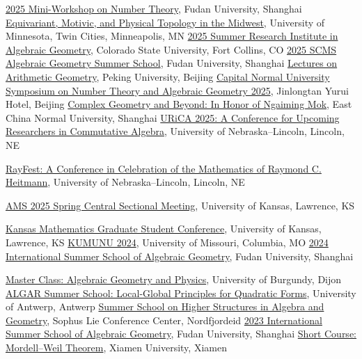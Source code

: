 \documentclass[11pt,letterpaper,sans]{moderncv}
\begin{document}
\cvitem{\textcolor{color1}{2025}}{}
  {\href{https://scms.fudan.edu.cn/info/5743/11611.htm}{2025 Mini-Workshop on Number Theory}, Fudan University, Shanghai}
  {\href{https://cse.umn.edu/math/events/equivariant-motivic-and-physical-topology-midwest}{Equivariant, Motivic, and Physical Topology in the Midwest}, University of Minnesota, Twin Cities, Minneapolis, MN}
  {\href{https://sites.google.com/view/2025summerinstitute/}{2025 Summer Research Institute in Algebraic Geometry}, Colorado State University, Fort Collins, CO}
  {\href{https://scms.fudan.edu.cn/info/5753/9971.htm}{2025 SCMS Algebraic Geometry Summer School}, Fudan University, Shanghai}
  {\href{https://www.math.pku.edu.cn/kxyj/xzky/168194.htm}{Lectures on Arithmetic Geometry}, Peking University, Beijing}
  {\href{https://ams.cnu.edu.cn/xxzx/xsrl/87ed1e213aa4497596844b5b2feebdd0.htm}{Capital Normal University Symposium on Number Theory and Algebraic Geometry 2025}, Jinlongtan Yurui Hotel, Beijing}
  {\href{https://math.ecnu.edu.cn/~scng/conference/mok_conference.html}{Complex Geometry and Beyond: In Honor of Ngaiming Mok}, East China Normal University, Shanghai}
  {\href{https://urica-unl.github.io/index.html}{URiCA 2025: A Conference for Upcoming Researchers in Commutative Algebra}, University of Nebraska--Lincoln, Lincoln, NE}
  {\raggedright{}\href{https://sites.google.com/view/rayfest}{RayFest: A Conference in Celebration of the Mathematics of Raymond C. Heitmann}, University of Nebraska--Lincoln, Lincoln, NE}
  {\href{https://www.ams.org/meetings/sectional/2321_deadlines.html}{AMS 2025 Spring Central Sectional Meeting}, University of Kansas, Lawrence, KS}

\cvitem{\textcolor{color1}{2024}}{}
  {\href{https://sites.google.com/view/kmgsc/}{Kansas Mathematics Graduate Student Conference}, University of Kansas, Lawrence, KS}
  {\href{https://sites.google.com/view/kumunu-2024/home}{KUMUNU 2024}, University of Missouri, Columbia, MO}
  {\href{https://scms.fudan.edu.cn/info/4588/6631.htm}{2024 International Summer School of Algebraic Geometry}, Fudan University, Shanghai}

\cvitem{\textcolor{color1}{2023}}{}
  {\href{http://ronan.terpereau.perso.math.cnrs.fr/Master_Class_2023_Dijon.html}{Master Class: Algebraic Geometry and Physics}, University of Burgundy, Dijon}
  {\href{https://www.uantwerpen.be/en/summer-winter-schools/algar/programme/previous-editions/2023/}{ALGAR Summer School: Local-Global Principles for Quadratic Forms}, University of Antwerp, Antwerp}
  {\href{https://wiki.math.ntnu.no/nordfjordeid2023/start}{Summer School on Higher Structures in Algebra and Geometry}, Sophus Lie Conference Center, Nordfjordeid}
  {\href{https://scms.fudan.edu.cn/info/4503/5820.htm}{2023 International Summer School of Algebraic Geometry}, Fudan University, Shanghai}
  {\href{https://tianyuan.xmu.edu.cn/cn/MiniCourses/3183.html}{Short Course: Mordell--Weil Theorem}, Xiamen University, Xiamen}
\end{document}
